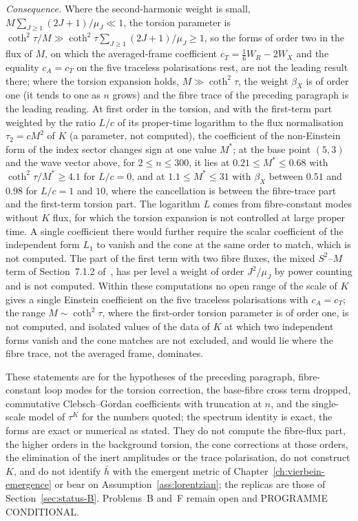 \emph{Consequence.} Where the second-harmonic weight is small, \(M\sum_{J\ge1}(2J+1)/\mu_J\ll1\), the torsion parameter is \(\coth^2\tau/M\gg\coth^2\tau\sum_{J\ge1}(2J+1)/\mu_J\ge1\), so the forms of order two in the flux of \(M\), on which the averaged-frame coefficient \(c_T=\tfrac16W_R-2W_X\) and the equality \(c_A=c_T\) on the five traceless polarisations rest, are not the leading result there; where the torsion expansion holds, \(M\gg\coth^2\tau\), the weight \(\beta_X\) is of order one (it tends to one as \(n\) grows) and the fibre trace of the preceding paragraph is the leading reading. At first order in the torsion, and with the first-term part weighted by the ratio \(L/c\) of its proper-time logarithm to the flux normalisation \(\tau_2=cM^2\) of \(K\) (a parameter, not computed), the coefficient of the non-Einstein form of the index sector changes sign at one value \(M^*\); at the base point \((5,3)\) and the wave vector above, for \(2\le n\le300\), it lies at \(0.21\le M^*\le0.68\) with \(\coth^2\tau/M^*\ge4.1\) for \(L/c=0\), and at \(1.1\le M^*\le31\) with \(\beta_X\) between \(0.51\) and \(0.98\) for \(L/c=1\) and \(10\), where the cancellation is between the fibre-trace part and the first-term torsion part. The logarithm \(L\) comes from fibre-constant modes without \(K\) flux, for which the torsion expansion is not controlled at large proper time. A single coefficient there would further require the scalar coefficient of the independent form \(L_1\) to vanish and the cone at the same order to match, which is not computed. The part of the first term with two fibre fluxes, the mixed \(S^2\)--\(M\) term of Section~7.1.2 of~\cite{Steinacker2023}, has per level a weight of order \(J^2/\mu_J\) by power counting and is not computed. Within these computations no open range of the scale of \(K\) gives a single Einstein coefficient on the five traceless polarisations with \(c_A=c_T\); the range \(M\sim\coth^2\tau\), where the first-order torsion parameter is of order one, is not computed, and isolated values of the data of \(K\) at which two independent forms vanish and the cone matches are not excluded, and would lie where the fibre trace, not the averaged frame, dominates.

These statements are for the hypotheses of the preceding paragraph, fibre-constant loop modes for the torsion correction, the base-fibre cross term dropped, commutative Clebsch--Gordan coefficients with truncation at \(n\), and the single-scale model of \(\tau^K\) for the numbers quoted; the spectrum identity is exact, the forms are exact or numerical as stated. They do not compute the fibre-flux part, the higher orders in the background torsion, the cone corrections at those orders, the elimination of the inert amplitudes or the trace polarisation, do not construct \(K\), and do not identify \(\bar h\) with the emergent metric of Chapter~\ref{ch:vierbein-emergence} or bear on Assumption~\ref{ass:lorentzian}; the replicas are those of Section~\ref{sec:status-B}. Problems~B and~F remain open and PROGRAMME CONDITIONAL.

